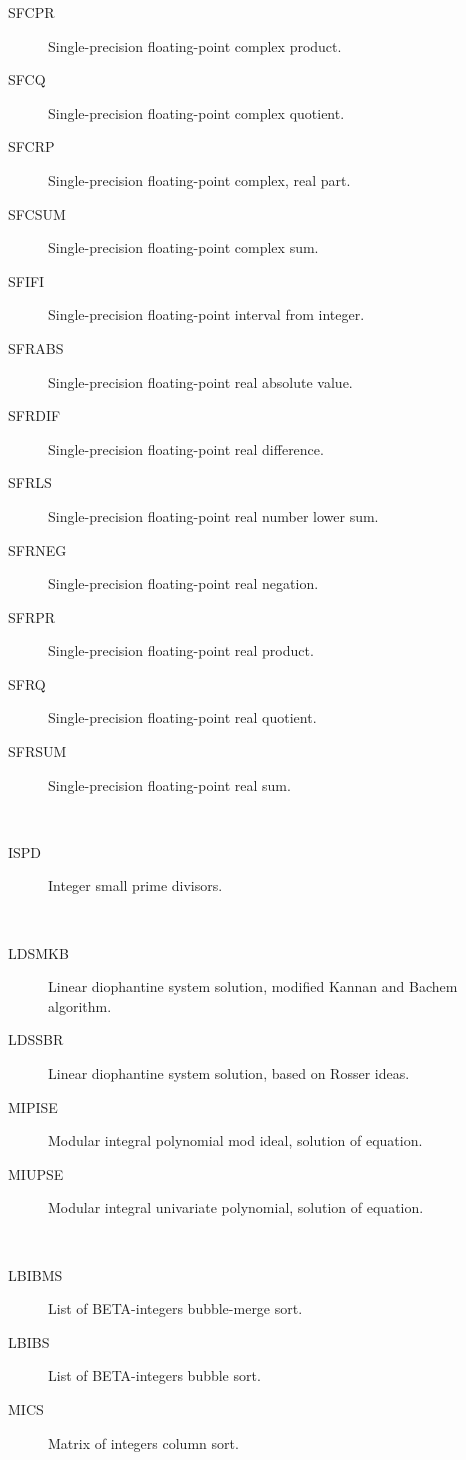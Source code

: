 \begin{description}
\begin{description}
  \item[SFCPR]  Single-precision floating-point complex product.
  \item[SFCQ]  Single-precision floating-point complex quotient.
  \item[SFCRP]  Single-precision floating-point complex, real part.
  \item[SFCSUM]  Single-precision floating-point complex sum.
  \item[SFIFI]  Single-precision floating-point interval from integer.
  \item[SFRABS]  Single-precision floating-point real absolute value.
  \item[SFRDIF]  Single-precision floating-point real difference.
  \item[SFRLS]  Single-precision floating-point real number lower sum.
  \item[SFRNEG]  Single-precision floating-point real negation.
  \item[SFRPR]  Single-precision floating-point real product.
  \item[SFRQ]  Single-precision floating-point real quotient.
  \item[SFRSUM]  Single-precision floating-point real sum.
  \end{description}
\item[small] \ \ 
  \begin{description}
  \item[ISPD]  Integer small prime divisors.
  \end{description}
\item[solution] \ \ 
  \begin{description}
  \item[LDSMKB]  Linear diophantine system solution, modified Kannan and
    Bachem algorithm.
  \item[LDSSBR]  Linear diophantine system solution, based on Rosser ideas.
  \item[MIPISE]  Modular integral polynomial mod ideal, solution of equation.
  \item[MIUPSE]  Modular integral univariate polynomial, solution of equation.
  \end{description}
\item[sort] \ \ 
  \begin{description}
  \item[LBIBMS]  List of BETA-integers bubble-merge sort.
  \item[LBIBS]  List of BETA-integers bubble sort.
  \item[MICS]  Matrix of integers column sort.

\end{description}
\end{description}
